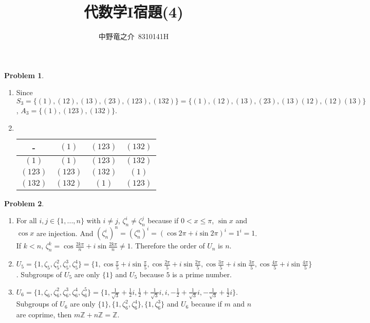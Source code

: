 \documentclass[a4paper, 12pt, fleqn]{article}
\title{代数学I宿題(4)}
\author{中野竜之介\ 8310141H}
\theoremstyle{definition}
\newtheorem{prb}{Problem}
\begin{document}
\maketitle

\begin{prb}
    $ $
    \begin{enumerate}
        \item Since $S_3 = \{(1),(12),(13),(23),(123),(132)\} = \{(1),(12),(13),(23),(13)(12),(12)(13)\}$, $A_3=\{(1),(123),(132)\}$.
        \item $ $
            \begin{table}[hb]
                \begin{tabular}{|c||c|c|c|}
                    \hline
                    - & $(1)$ & $(123)$ & $(132)$ \\ \hline \hline
                    $(1)$ & $(1)$ & $(123)$ & $(132)$\\ \hline
                    $(123)$ & $(123)$ & $(132)$ & $(1)$\\ \hline
                    $(132)$ & $(132)$ & $(1)$ & $(123)$\\ \hline
                \end{tabular}
            \end{table}
    \end{enumerate}
\end{prb}

\begin{prb}
    $ $
    \begin{enumerate}
        \item For all $i,j\in \{1,...,n\}$ with $i\neq j$, $\zeta _n ^i \neq \zeta _n ^j$ because if $0 < x \leq \pi$, $\sin x$ and $\cos x$ are injection. And $(\zeta _n ^i)^n = (\zeta_n ^n)^i = (\cos 2\pi + i \sin 2\pi)^i = 1^i = 1$. If $k<n$, $\zeta_n ^k = \cos \frac{2k\pi}{n} + i\sin \frac{2k\pi}{n} \neq 1$. Therefore the order of $U_n$ is $n$.
        \item $U_5 = \{1, \zeta_5 ,\zeta_5 ^2,\zeta_5 ^3,\zeta_5 ^4\} = \{1,\cos \frac{\pi}{5} + i\sin \frac{\pi}{5},\cos \frac{2\pi}{5} + i\sin \frac{2\pi}{5},\cos \frac{3\pi}{5} + i\sin \frac{3\pi}{5},\cos \frac{4\pi}{5} + i\sin \frac{4\pi}{5}\}$. Subgroups of $U_5$ are only $\{1\}$ and $U_5$ because $5$ is a prime number.
        \item $U_6 = \{1, \zeta_6 ,\zeta_6 ^2,\zeta_6 ^3,\zeta_6 ^4,\zeta_6 ^5\} = \{1,\frac{1}{\sqrt{3}}+\frac{1}{2}i,\frac{1}{2} + \frac{1}{\sqrt{3}}i,i,-\frac{1}{2}+\frac{1}{\sqrt3}i,-\frac{1}{\sqrt{3}}+\frac{1}{2}i\}$.\\
        Subgroups of $U_6$ are only $\{1\},\{1,\zeta_6 ^2,\zeta_6^4\},\{1,\zeta_6 ^3\}$ and $U_6$ because if $m$ and $n$ are coprime, then $m\mathbb{Z}+n\mathbb{Z} = \mathbb{Z}$.
    \end{enumerate}
\end{prb}
\end{document}
